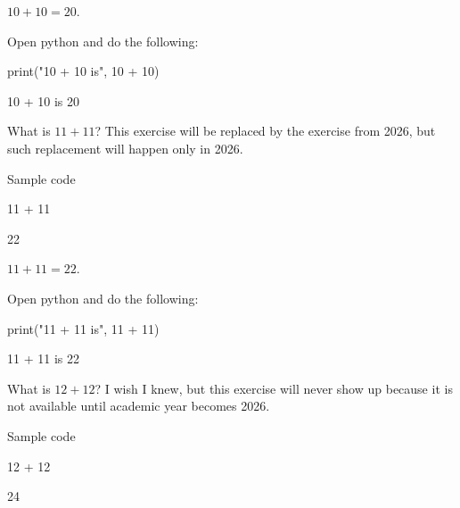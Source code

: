 \documentclass{book}
\begin{document}
\begin{solution}
  \(10 + 10 = 20\).
\end{solution}

\begin{additionalinformation}
Open python and do the following:

\begin{pycell}
print("10 + 10 is", 10 + 10)
\end{pycell}
\begin{pyexpectedoutput}
10 + 10 is 20
\end{pyexpectedoutput}
\end{additionalinformation}

\begin{exercise}[examdate={January 16, 2025}, examproblemnumber={1}, examproblemid={2025-01-16-01}, replacedbyexamproblemid={2026-01-16-01}, replacementsinceacademicyear={2026/2027}]
  What is \(11 + 11\)? This exercise will be replaced by the exercise from 2026, but such replacement will happen only in 2026.

Sample code
\begin{pycell}
11 + 11
\end{pycell}
\begin{pyexpectedoutput}
22
\end{pyexpectedoutput}
\end{exercise}

\begin{solution}
  \(11 + 11 = 22\).
\end{solution}

\begin{additionalinformation}
Open python and do the following:

\begin{pycell}
print("11 + 11 is", 11 + 11)
\end{pycell}
\begin{pyexpectedoutput}
11 + 11 is 22
\end{pyexpectedoutput}
\end{additionalinformation}

\begin{exercise}[examdate={January 16, 2026}, examproblemnumber={1}, examproblemid={2026-01-16-01}]
  What is \(12 + 12\)? I wish I knew, but this exercise will never show up because it is not available until academic year becomes 2026.

Sample code
\begin{pycell}
12 + 12
\end{pycell}
\begin{pyexpectedoutput}
24
\end{pyexpectedoutput}
\end{exercise}
\end{document}

